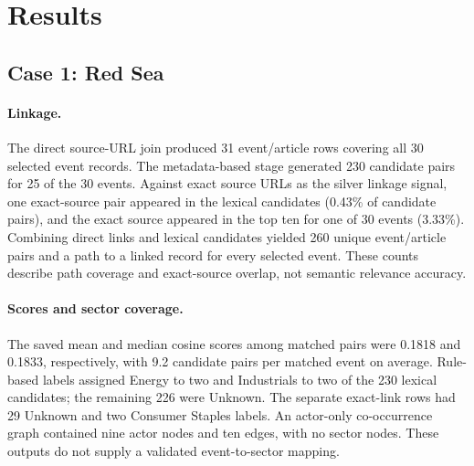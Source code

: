 \documentclass[10pt,a4paper,twocolumn]{article}
\begin{document}
\section{Results}\label{sec:results}

\subsection{Case 1: Red Sea}

\paragraph{Linkage.} The direct source-URL join produced 31 event/article rows covering all 30 selected event records. The metadata-based stage generated 230 candidate pairs for 25 of the 30 events. Against exact source URLs as the silver linkage signal, one exact-source pair appeared in the lexical candidates (0.43\% of candidate pairs), and the exact source appeared in the top ten for one of 30 events (3.33\%). Combining direct links and lexical candidates yielded 260 unique event/article pairs and a path to a linked record for every selected event. These counts describe path coverage and exact-source overlap, not semantic relevance accuracy.

\paragraph{Scores and sector coverage.} The saved mean and median cosine scores among matched pairs were 0.1818 and 0.1833, respectively, with 9.2 candidate pairs per matched event on average. Rule-based labels assigned Energy to two and Industrials to two of the 230 lexical candidates; the remaining 226 were Unknown. The separate exact-link rows had 29 Unknown and two Consumer Staples labels. An actor-only co-occurrence graph contained nine actor nodes and ten edges, with no sector nodes. These outputs do not supply a validated event-to-sector mapping.
\end{document}
